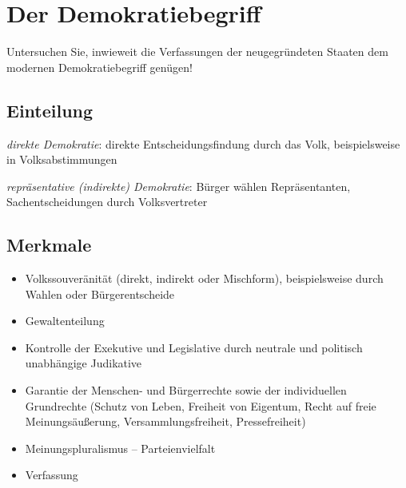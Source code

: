 \section{Der Demokratiebegriff}
\label{sec:dem-begr}

\begin{aufgabe}
Untersuchen Sie, inwieweit die Verfassungen der neugegründeten Staaten
dem modernen Demokratiebegriff genügen!
\end{aufgabe}

\subsection*{Einteilung}

\begin{multicols}{2}
\noindent \emph{direkte Demokratie}:
direkte Entscheidungsfindung durch das Volk, beispielsweise in
Volksabstimmungen

\columnbreak

\noindent \emph{repräsentative (indirekte) Demokratie}:
Bürger wählen Repräsentanten, Sachentscheidungen durch Volksvertreter
\end{multicols}

\subsection*{Merkmale}

\begin{itemize}
\item Volkssouveränität (direkt, indirekt oder Mischform),
beispielsweise durch Wahlen oder Bürgerentscheide
\item Gewaltenteilung
\item Kontrolle der Exekutive und Legislative durch neutrale und
politisch unabhängige Judikative
\item Garantie der Menschen- und Bürgerrechte sowie der individuellen
Grundrechte (Schutz von Leben, Freiheit von Eigentum, Recht auf freie
Meinungsäußerung, Versammlungsfreiheit, Pressefreiheit)
\item Meinungspluralismus -- Parteienvielfalt
\item Verfassung
\end{itemize}

\endinput
